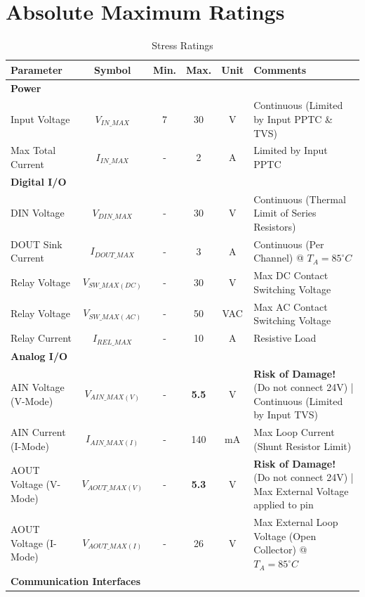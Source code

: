 \documentclass[10pt]{datasheet}
\begin{document}
\clearpage


\section{Absolute Maximum Ratings}
\begin{table}[H]
\caption{Stress Ratings}
\begin{tabularx}{\textwidth}{l | c | c c | c | X}
    \thickhline
    \textbf{Parameter} & \textbf{Symbol} & \textbf{Min.} & \textbf{Max.} & \textbf{Unit} & \textbf{Comments} \\
    \hline
    \multicolumn{6}{l}{\textbf{Power}} \\
    \hline
    Input Voltage       & $V_{IN\_MAX}$  & 7 & 30 & V & Continuous (Limited by Input PPTC \& TVS) \\
    Max Total Current   & $I_{IN\_MAX}$  & - & 2 & A & Limited by Input PPTC \\
    \hline
    \multicolumn{6}{l}{\textbf{Digital I/O}} \\
    \hline
    DIN Voltage         & $V_{DIN\_MAX}$ & - & 30 & V & Continuous (Thermal Limit of Series Resistors)\\
    \hline
    DOUT Sink Current   & $I_{DOUT\_MAX}$ & - & 3 & A & Continuous (Per Channel) @ $T_A = 85^{\circ}C$\\
    Relay Voltage       & $V_{SW\_MAX(DC)}$ & - & 30 & V & Max DC Contact Switching Voltage \\
    Relay Voltage       & $V_{SW\_MAX(AC)}$ & -  & 50 & VAC & Max AC Contact Switching Voltage \\
    Relay Current       & $I_{REL\_MAX}$ & - & 10 & A & Resistive Load \\
    \hline
    \multicolumn{6}{l}{\textbf{Analog I/O}} \\
    \hline
    AIN Voltage (V-Mode)& $V_{AIN\_MAX(V)}$ & -   & \textbf{5.5} & V & \textbf{Risk of Damage!} (Do not connect 24V) | Continuous (Limited by Input TVS)\\
    AIN Current (I-Mode)& $I_{AIN\_MAX(I)}$ & -   & 140 & mA & Max Loop Current (Shunt Resistor Limit) \\
    \hline
    AOUT Voltage (V-Mode)& $V_{AOUT\_MAX(V)}$ & - & \textbf{5.3} & V & \textbf{Risk of Damage!} (Do not connect 24V) | Max External Voltage applied to pin \\
    AOUT Voltage (I-Mode)& $V_{AOUT\_MAX(I)}$ & - & 26 & V & Max External Loop Voltage (Open Collector) @ $T_A = 85^{\circ}C$ \\
    \hline
    \multicolumn{6}{l}{\textbf{Communication Interfaces}} \\

\end{tabularx}
\end{table}
\end{document}
